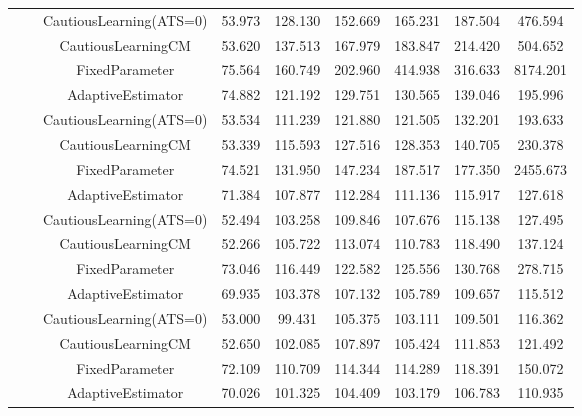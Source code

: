 \begin{table}[!h]
\begin{tabular}[t]{ccccccccc}
 &  & CautiousLearning(ATS=0) & 53.973 & 128.130 & 152.669 & 165.231 & 187.504 & 476.594\\

 &  & CautiousLearningCM & 53.620 & 137.513 & 167.979 & 183.847 & 214.420 & 504.652\\

 & \multirow[t]{-4}{*}{\centering\arraybackslash 0.35} & FixedParameter & 75.564 & 160.749 & 202.960 & 414.938 & 316.633 & 8174.201\\
\cmidrule{2-9}
 &  & AdaptiveEstimator & 74.882 & 121.192 & 129.751 & 130.565 & 139.046 & 195.996\\

 &  & CautiousLearning(ATS=0) & 53.534 & 111.239 & 121.880 & 121.505 & 132.201 & 193.633\\

 &  & CautiousLearningCM & 53.339 & 115.593 & 127.516 & 128.353 & 140.705 & 230.378\\

 & \multirow[t]{-4}{*}{\centering\arraybackslash 0.50} & FixedParameter & 74.521 & 131.950 & 147.234 & 187.517 & 177.350 & 2455.673\\
\cmidrule{2-9}
 &  & AdaptiveEstimator & 71.384 & 107.877 & 112.284 & 111.136 & 115.917 & 127.618\\

 &  & CautiousLearning(ATS=0) & 52.494 & 103.258 & 109.846 & 107.676 & 115.138 & 127.495\\

 &  & CautiousLearningCM & 52.266 & 105.722 & 113.074 & 110.783 & 118.490 & 137.124\\

 & \multirow[t]{-4}{*}{\centering\arraybackslash 0.75} & FixedParameter & 73.046 & 116.449 & 122.582 & 125.556 & 130.768 & 278.715\\
\cmidrule{2-9}
 &  & AdaptiveEstimator & 69.935 & 103.378 & 107.132 & 105.789 & 109.657 & 115.512\\

 &  & CautiousLearning(ATS=0) & 53.000 & 99.431 & 105.375 & 103.111 & 109.501 & 116.362\\

 &  & CautiousLearningCM & 52.650 & 102.085 & 107.897 & 105.424 & 111.853 & 121.492\\

 & \multirow[t]{-4}{*}{\centering\arraybackslash 1.00} & FixedParameter & 72.109 & 110.709 & 114.344 & 114.289 & 118.391 & 150.072\\
\cmidrule{2-9}
 &  & AdaptiveEstimator & 70.026 & 101.325 & 104.409 & 103.179 & 106.783 & 110.935\\


\end{tabular}
\end{table}
